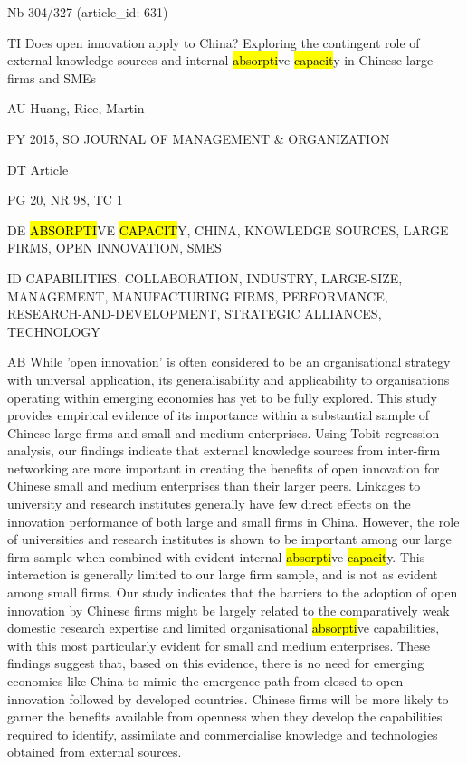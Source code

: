 \documentclass[a4paper]{article}
\begin{document}
\vspace*{-2cm}
Nb \tabto{0cm}304/327 (article\_id: 631)\par
TI \tabto{0cm}Does open innovation apply to China? Exploring the contingent role of external knowledge sources and internal \hl{absorpti}ve \hl{capacit}y in Chinese large firms and SMEs\par
AU \tabto{0cm}Huang, Rice, Martin\par
PY \tabto{0cm}2015, SO JOURNAL OF MANAGEMENT \& ORGANIZATION\par
DT \tabto{0cm}Article\par
PG \tabto{0cm}20, NR 98, TC 1\par
DE \tabto{0cm}\hl{ABSORPTI}VE \hl{CAPACIT}Y, CHINA, KNOWLEDGE SOURCES, LARGE FIRMS, OPEN INNOVATION, SMES\par
ID \tabto{0cm}CAPABILITIES, COLLABORATION, INDUSTRY, LARGE-SIZE, MANAGEMENT, MANUFACTURING FIRMS, PERFORMANCE, RESEARCH-AND-DEVELOPMENT, STRATEGIC ALLIANCES, TECHNOLOGY\par
AB \tabto{0cm}While 'open innovation' is often considered to be an organisational strategy with universal application, its generalisability and applicability to organisations operating within emerging economies has yet to be fully explored. This study provides empirical evidence of its importance within a substantial sample of Chinese large firms and small and medium enterprises. Using Tobit regression analysis, our findings indicate that external knowledge sources from inter-firm networking are more important in creating the benefits of open innovation for Chinese small and medium enterprises than their larger peers. Linkages to university and research institutes generally have few direct effects on the innovation performance of both large and small firms in China. However, the role of universities and research institutes is shown to be important among our large firm sample when combined with evident internal \hl{absorpti}ve \hl{capacit}y. This interaction is generally limited to our large firm sample, and is not as evident among small firms.
Our study indicates that the barriers to the adoption of open innovation by Chinese firms might be largely related to the comparatively weak domestic research expertise and limited organisational \hl{absorpti}ve capabilities, with this most particularly evident for small and medium enterprises.
These findings suggest that, based on this evidence, there is no need for emerging economies like China to mimic the emergence path from closed to open innovation followed by developed countries. Chinese firms will be more likely to garner the benefits available from openness when they develop the capabilities required to identify, assimilate and commercialise knowledge and technologies obtained from external sources.\par
\clearpage
\end{document}
